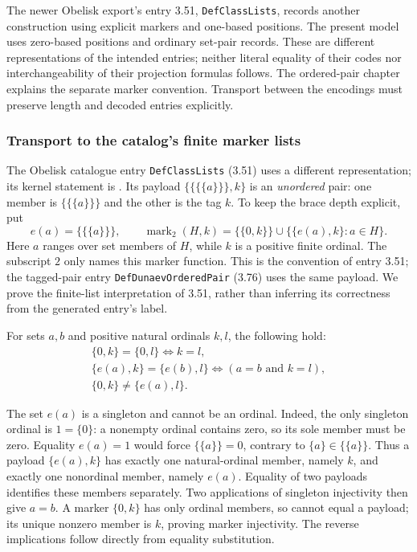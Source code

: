 The newer Obelisk export's entry 3.51, \texttt{DefClassLists}, records
another construction using explicit markers and one-based positions.
The present model uses zero-based positions and ordinary set-pair
records. These are different representations of the intended entries;
neither literal equality of their codes nor interchangeability of their
projection formulas follows. The ordered-pair chapter explains the
separate marker convention. Transport between the encodings must
preserve length and decoded entries explicitly.
\subsubsection{Transport to the catalog's finite marker lists}
The Obelisk catalogue entry \texttt{DefClassLists} (3.51) uses a different
representation; its kernel statement is .
Its payload $\{\{\{\{a\}\}\},k\}$ is an \emph{unordered} pair: one member is
$\{\{\{a\}\}\}$ and the other is the tag $k$. To keep the brace depth
explicit, put
\[
e(a)=\{\{\{a\}\}\},\qquad
\operatorname{mark}_2(H,k)
 =\{\{0,k\}\}\cup\{\{e(a),k\}:a\in H\}.
\]
Here $a$ ranges over set members of $H$, while $k$ is a positive finite
ordinal. The subscript $2$ only names this marker function.
This is the convention of entry 3.51; the tagged-pair entry
\texttt{DefDunaevOrderedPair} (3.76) uses the same payload.
We prove the finite-list interpretation of 3.51, rather than inferring
its correctness from the generated entry's label.

\begin{lemma}
For sets $a,b$ and positive natural ordinals $k,l$, the following hold:
\[
\begin{gathered}
\{0,k\}=\{0,l\}\iff k=l,\\
\{e(a),k\}=\{e(b),l\}\iff (a=b\text{ and }k=l),\\
\{0,k\}\ne\{e(a),l\}.
\end{gathered}
\]
\end{lemma}
\Proof
The set $e(a)$ is a singleton and cannot be an ordinal. Indeed, the
only singleton ordinal is $1=\{0\}$: a nonempty ordinal contains zero,
so its sole member must be zero. Equality $e(a)=1$ would force
$\{\{a\}\}=0$, contrary to $\{a\}\in\{\{a\}\}$. Thus a payload
$\{e(a),k\}$ has exactly one natural-ordinal member, namely $k$,
and exactly one nonordinal member, namely $e(a)$. Equality of two
payloads identifies these members separately. Two applications of
singleton injectivity then give $a=b$. A marker $\{0,k\}$ has
only ordinal members, so cannot equal a payload; its unique nonzero
member is $k$, proving marker injectivity. The reverse implications
follow directly from equality substitution.
\Done

